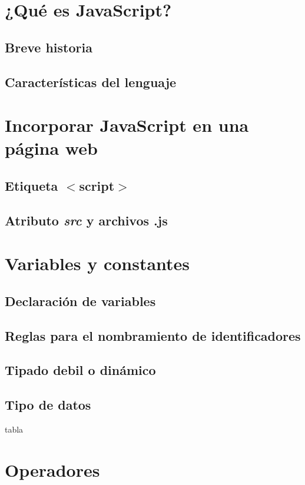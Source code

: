 \documentclass[12pt]{report}
\begin{document}
	\section{¿Qué es JavaScript?}
		\subsection{Breve historia}
		\subsection{Características del lenguaje}
	\section{Incorporar JavaScript en una página web}
		\subsection{Etiqueta $<$script$>$}
		\subsection{Atributo \textit{src} y archivos .js}
	\section{Variables y constantes}
		\subsection{Declaración de variables}
		\subsection{Reglas para el nombramiento de identificadores}
		\subsection{Tipado debil o dinámico}
		\subsection{Tipo de datos}
			tabla
	\section{Operadores}
\end{document}
